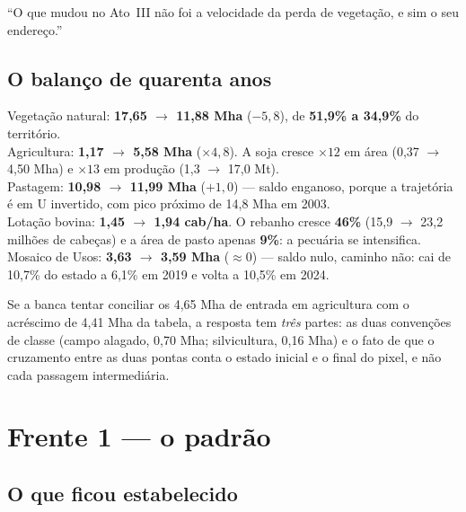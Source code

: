 \begin{nabanca}
``O que mudou no Ato~III não foi a velocidade da perda de vegetação, e sim o seu
endereço.''
\end{nabanca}

\section{O balanço de quarenta anos}

\begin{ancora}
Vegetação natural: \textbf{17,65 $\to$ 11,88 Mha} ($-5{,}8$), de \textbf{51,9\%
a 34,9\%} do território. \\
Agricultura: \textbf{1,17 $\to$ 5,58 Mha} ($\times 4{,}8$). A soja cresce
$\times 12$ em área (0,37 $\to$ 4,50 Mha) e $\times 13$ em produção
(1,3 $\to$ 17,0 Mt). \\
Pastagem: \textbf{10,98 $\to$ 11,99 Mha} ($+1{,}0$) --- saldo enganoso, porque a
trajetória é em U invertido, com pico próximo de 14,8 Mha em 2003. \\
Lotação bovina: \textbf{1,45 $\to$ 1,94 cab/ha}. O rebanho cresce \textbf{46\%}
(15,9 $\to$ 23,2 milhões de cabeças) e a área de pasto apenas \textbf{9\%}: a
pecuária se intensifica. \\
Mosaico de Usos: \textbf{3,63 $\to$ 3,59 Mha} ($\approx 0$) --- saldo nulo,
caminho não: cai de 10,7\% do estado a 6,1\% em 2019 e volta a 10,5\% em 2024.
\end{ancora}

\begin{armadilha}
Se a banca tentar conciliar os 4,65 Mha de entrada em agricultura com o
acréscimo de 4,41 Mha da tabela, a resposta tem \emph{três} partes: as duas
convenções de classe (campo alagado, 0,70 Mha; silvicultura, 0,16 Mha) e o fato
de que o cruzamento entre as duas pontas conta o estado inicial e o final do
pixel, e não cada passagem intermediária.
\end{armadilha}

\chapter{Frente 1 --- o padrão}

\section{O que ficou estabelecido}

